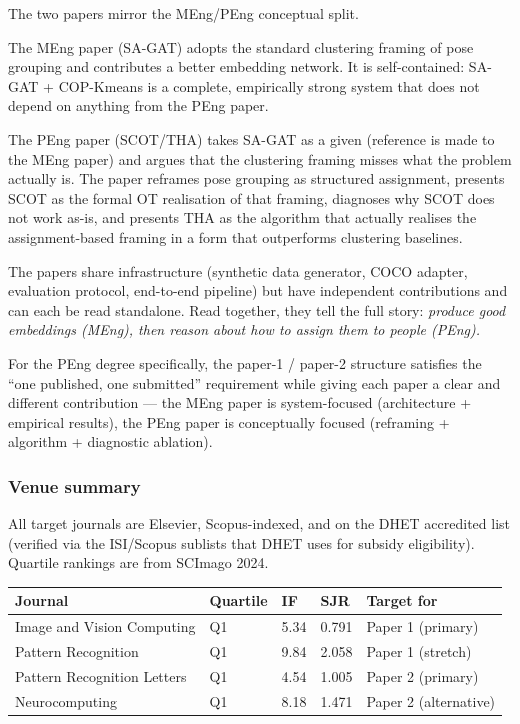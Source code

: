 The two papers mirror the MEng/PEng conceptual split.

The MEng paper (SA-GAT) adopts the standard clustering framing of pose grouping and contributes a better embedding network. It is self-contained: SA-GAT + COP-Kmeans is a complete, empirically strong system that does not depend on anything from the PEng paper.

The PEng paper (SCOT/THA) takes SA-GAT as a given (reference is made to the MEng paper) and argues that the clustering framing misses what the problem actually is. The paper reframes pose grouping as structured assignment, presents SCOT as the formal OT realisation of that framing, diagnoses why SCOT does not work as-is, and presents THA as the algorithm that actually realises the assignment-based framing in a form that outperforms clustering baselines.

The papers share infrastructure (synthetic data generator, COCO adapter, evaluation protocol, end-to-end pipeline) but have independent contributions and can each be read standalone. Read together, they tell the full story: \emph{produce good embeddings (MEng), then reason about how to assign them to people (PEng).}

For the PEng degree specifically, the paper-1 / paper-2 structure satisfies the ``one published, one submitted'' requirement while giving each paper a clear and different contribution --- the MEng paper is system-focused (architecture + empirical results), the PEng paper is conceptually focused (reframing + algorithm + diagnostic ablation).

\subsubsection{Venue summary}

All target journals are Elsevier, Scopus-indexed, and on the DHET accredited list (verified via the ISI/Scopus sublists that DHET uses for subsidy eligibility). Quartile rankings are from SCImago 2024.

\begin{tabular}{lllll}
\hline
\textbf{Journal} & \textbf{Quartile} & \textbf{IF} & \textbf{SJR} & \textbf{Target for} \\
\hline
Image and Vision Computing & Q1 & 5.34 & 0.791 & Paper 1 (primary) \\
Pattern Recognition & Q1 & 9.84 & 2.058 & Paper 1 (stretch) \\
Pattern Recognition Letters & Q1 & 4.54 & 1.005 & Paper 2 (primary) \\
Neurocomputing & Q1 & 8.18 & 1.471 & Paper 2 (alternative) \\
\hline
\end{tabular}

